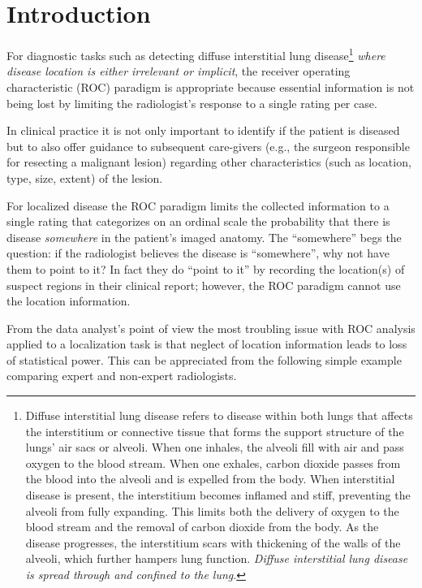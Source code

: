 \documentclass[
]{book}
\begin{document}
\hypertarget{froc-paradigm-intro}{%
\section{Introduction}\label{froc-paradigm-intro}}

For diagnostic tasks such as detecting diffuse interstitial lung disease\footnote{Diffuse interstitial lung disease refers to disease within both lungs that affects the interstitium or connective tissue that forms the support structure of the lungs' air sacs or alveoli. When one inhales, the alveoli fill with air and pass oxygen to the blood stream. When one exhales, carbon dioxide passes from the blood into the alveoli and is expelled from the body. When interstitial disease is present, the interstitium becomes inflamed and stiff, preventing the alveoli from fully expanding. This limits both the delivery of oxygen to the blood stream and the removal of carbon dioxide from the body. As the disease progresses, the interstitium scars with thickening of the walls of the alveoli, which further hampers lung function. \emph{Diffuse interstitial lung disease is spread through and confined to the lung}.} \emph{where disease location is either irrelevant or implicit}, the receiver operating characteristic (ROC) paradigm is appropriate because essential information is not being lost by limiting the radiologist's response to a single rating per case.

In clinical practice it is not only important to identify if the patient is diseased but to also offer guidance to subsequent care-givers (e.g., the surgeon responsible for resecting a malignant lesion) regarding other characteristics (such as location, type, size, extent) of the lesion.

For localized disease the ROC paradigm limits the collected information to a single rating that categorizes on an ordinal scale the probability that there is disease \emph{somewhere} in the patient's imaged anatomy. The ``somewhere'' begs the question: if the radiologist believes the disease is ``somewhere'', why not have them to point to it? In fact they do ``point to it'' by recording the location(s) of suspect regions in their clinical report; however, the ROC paradigm cannot use the location information.

From the data analyst's point of view the most troubling issue with ROC analysis applied to a localization task is that neglect of location information leads to loss of statistical power. This can be appreciated from the following simple example comparing expert and non-expert radiologists.
\end{document}
